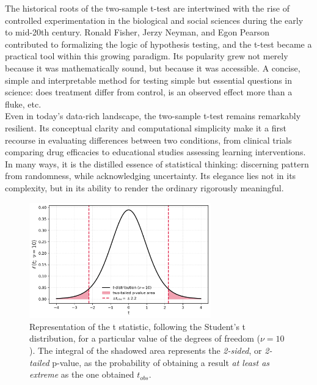 \documentclass{book}
\begin{document}
The historical roots of the two-sample t-test are intertwined with the rise of controlled experimentation in the biological and social sciences during the early to mid-20th century. Ronald Fisher, Jerzy Neyman, and Egon Pearson contributed to formalizing the logic of hypothesis testing, and the t-test became a practical tool within this growing paradigm. Its popularity grew not merely because it was mathematically sound, but because it was accessible. A concise, simple and interpretable method for testing simple but essential questions in science: does treatment differ from control, is an observed effect more than a fluke, etc.\\

Even in today’s data-rich landscape, the two-sample t-test remains remarkably resilient. Its conceptual clarity and computational simplicity make it a first recourse in evaluating differences between two conditions, from clinical trials comparing drug efficacies to educational studies assessing learning interventions. In many ways, it is the distilled essence of statistical thinking: discerning pattern from randomness, while acknowledging uncertainty. Its elegance lies not in its complexity, but in its ability to render the ordinary rigorously meaningful.\\

\begin{figure}[ht]
    \centering
    \includegraphics[width=0.7\textwidth]{figures/chapter4/t_test_1_sample_p_two_tailed.png}
    \caption{Representation of the t statistic, following the Student's t distribution, for a particular value of the degrees of freedom ($\nu = 10$). The integral of the shadowed area represents the \textit{2-sided}, or \textit{2-tailed} p-value, as the probability of obtaining a result \textit{at least as extreme} as the one obtained $t_{obs}$.}
    \label{fig:t_test2}
\end{figure}
\end{document}
